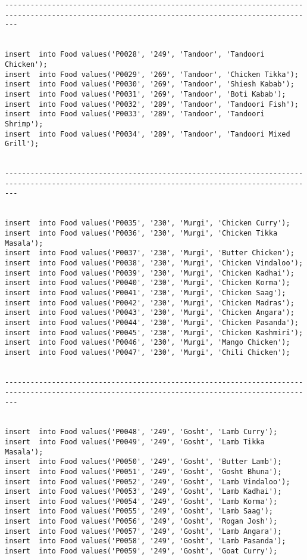 \documentclass[a4,12pt]{report}
\begin{document}
\begin{lstlisting}
-----------------------------------------------------------------------------------------------------------------------------------------------


insert  into Food values('P0028', '249', 'Tandoor', 'Tandoori Chicken');
insert  into Food values('P0029', '269', 'Tandoor', 'Chicken Tikka');
insert  into Food values('P0030', '269', 'Tandoor', 'Shiesh Kabab');
insert  into Food values('P0031', '269', 'Tandoor', 'Boti Kabab');
insert  into Food values('P0032', '289', 'Tandoor', 'Tandoori Fish');
insert  into Food values('P0033', '289', 'Tandoor', 'Tandoori Shrimp');
insert  into Food values('P0034', '289', 'Tandoor', 'Tandoori Mixed Grill');


-----------------------------------------------------------------------------------------------------------------------------------------------


insert  into Food values('P0035', '230', 'Murgi', 'Chicken Curry');
insert  into Food values('P0036', '230', 'Murgi', 'Chicken Tikka Masala');
insert  into Food values('P0037', '230', 'Murgi', 'Butter Chicken');
insert  into Food values('P0038', '230', 'Murgi', 'Chicken Vindaloo');
insert  into Food values('P0039', '230', 'Murgi', 'Chicken Kadhai');
insert  into Food values('P0040', '230', 'Murgi', 'Chicken Korma');
insert  into Food values('P0041', '230', 'Murgi', 'Chicken Saag');
insert  into Food values('P0042', '230', 'Murgi', 'Chicken Madras');
insert  into Food values('P0043', '230', 'Murgi', 'Chicken Angara');
insert  into Food values('P0044', '230', 'Murgi', 'Chicken Pasanda');
insert  into Food values('P0045', '230', 'Murgi', 'Chicken Kashmiri');
insert  into Food values('P0046', '230', 'Murgi', 'Mango Chicken');
insert  into Food values('P0047', '230', 'Murgi', 'Chili Chicken');


-----------------------------------------------------------------------------------------------------------------------------------------------


insert  into Food values('P0048', '249', 'Gosht', 'Lamb Curry');
insert  into Food values('P0049', '249', 'Gosht', 'Lamb Tikka Masala');
insert  into Food values('P0050', '249', 'Gosht', 'Butter Lamb');
insert  into Food values('P0051', '249', 'Gosht', 'Gosht Bhuna');
insert  into Food values('P0052', '249', 'Gosht', 'Lamb Vindaloo');
insert  into Food values('P0053', '249', 'Gosht', 'Lamb Kadhai');
insert  into Food values('P0054', '249', 'Gosht', 'Lamb Korma');
insert  into Food values('P0055', '249', 'Gosht', 'Lamb Saag');
insert  into Food values('P0056', '249', 'Gosht', 'Rogan Josh');
insert  into Food values('P0057', '249', 'Gosht', 'Lamb Angara');
insert  into Food values('P0058', '249', 'Gosht', 'Lamb Pasanda');
insert  into Food values('P0059', '249', 'Gosht', 'Goat Curry');



\end{lstlisting}
\end{document}
